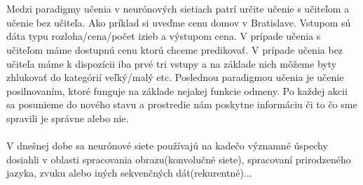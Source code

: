 \documentclass{article}
\numberwithin{equation}{section} %
\begin{document}
\\\\
Medzi paradigmy učenia v neurónových sietiach patrí určite učenie s učiteľom a učenie bez učiteľa. Ako príklad si uveďme cenu domov v Bratislave. Vstupom sú dáta typu rozloha/cena/počet izieb a výstupom cena. V prípade učenia s učiteľom máme dostupnú cenu ktorú chceme predikovať. V prípade učenia bez učiteľa máme k dispozícii iba prvé tri vstupy a na základe nich môžeme byty zhlukovať do kategórií veľký/malý etc. Poslednou paradigmou učenia je učenie posilnovaním, ktoré funguje na základe nejakej funkcie odmeny. Po každej akcii sa posunieme do nového stavu a prostredie nám poskytne informáciu či to čo sme spravili je správne alebo nie.
\\\\
V dnešnej dobe sa neurónové siete používajú na kadečo významné úspechy dosiahli v oblasti spracovania obrazu(konvolučné siete), spracovaní prirodzeného jazyka, zvuku alebo iných sekvenčných dát(rekurentné)...
\end{document}
